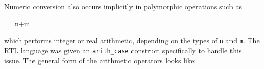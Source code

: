 \goodbreak
{}

Numeric conversion also occurs implicitly in polymorphic operations such as

{\ttfamily\mdseries
\ \ \ n+m}

\noindent which performs integer or real arithmetic, depending on the
types of \texttt{n} and \texttt{m}. The RTL language was given an
\texttt{arith\_case} construct specifically to handle this issue. The
general form of the arithmetic operators looks like:


